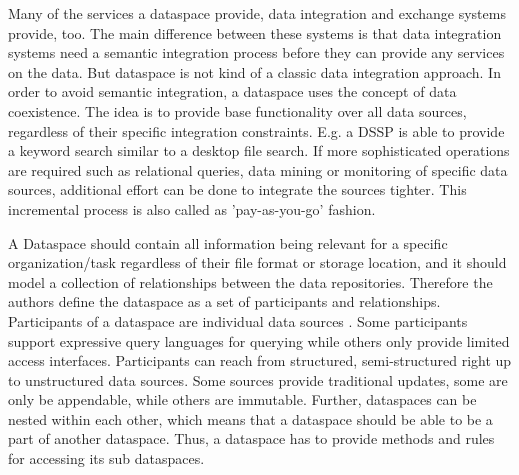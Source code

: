 Many of the services a dataspace provide, data integration and exchange systems provide, too. The main difference between these systems is that data integration systems need a semantic integration process before they can provide any services on the data. But dataspace is not kind of a classic data integration approach. In order to avoid semantic integration, a dataspace uses the concept of data coexistence.  The idea is to provide base functionality over all data sources, regardless of their specific integration constraints. E.g. a DSSP is able to provide a keyword search similar to a desktop file search. If more sophisticated operations are required such as relational queries, data mining or monitoring of specific data sources, additional effort can be done to integrate the sources tighter. This incremental process is also called as 'pay-as-you-go' fashion.





A Dataspace should contain all information being relevant for a specific organization/task regardless of their file format or storage location, and it should model a collection of relationships between the data repositories. Therefore the authors define the dataspace as a set of participants and relationships. Participants of a dataspace are individual data sources . Some participants support expressive query languages for querying while others only provide limited access interfaces. Participants can reach from structured, semi-structured right up to unstructured data sources. Some sources provide traditional updates, some are only be appendable, while others are immutable. Further, dataspaces can be nested within each other, which means that a dataspace should be able to be a part of another dataspace.  Thus, a dataspace has to provide methods and rules for accessing its sub dataspaces.


